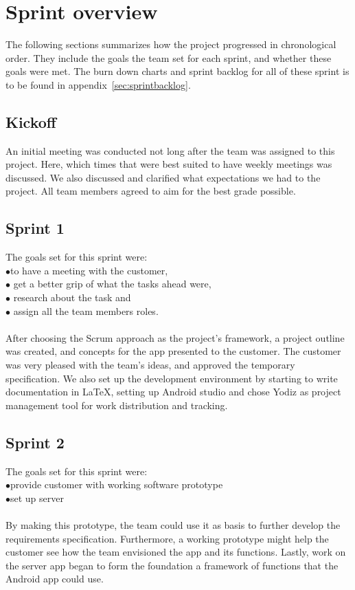 \newpage
\section{Sprint overview}
\label{sec:sprintOverview}
The following sections summarizes how the project progressed in chronological order. They include the goals the team set for each sprint, and whether these goals were met. The burn down charts and sprint backlog for all of these sprint is to be found in appendix~\ref{sec:sprintbacklog}.

\subsection{Kickoff}
An initial meeting was conducted not long after the team was assigned to this project. Here, which times that were best suited to have weekly meetings was discussed. We also discussed and clarified what expectations we had to the project. All team members agreed to aim for the best grade possible.

\subsection{Sprint 1}
The goals set for this sprint were:\\
$\bullet$\hspace{0.25cm}to have a meeting with the customer,\\
$\bullet$\hspace{0.25cm} get a better grip of what the tasks ahead were,\\
$\bullet$\hspace{0.25cm} research about the task and\\
$\bullet$\hspace{0.25cm} assign all the team members roles.\\\\
After choosing the Scrum approach as the project's framework, a project outline was created, and concepts for the app presented to the customer. The customer was very pleased with the team's ideas, and approved the temporary specification. We also set up the development environment by starting to write documentation in \LaTeX, setting up Android studio and chose Yodiz as project management tool for work distribution and tracking.

\subsection{Sprint 2}
The goals set for this sprint were:\\
$\bullet$\hspace{0.25cm}provide customer with working software prototype\\
$\bullet$\hspace{0.25cm}set up server\\\\
By making this prototype, the team could use it as basis to further develop the requirements specification. Furthermore, a working prototype might help the customer see how the team envisioned the app and its functions. Lastly, work on the server app began to form the foundation a framework of functions that the Android app could use. 

